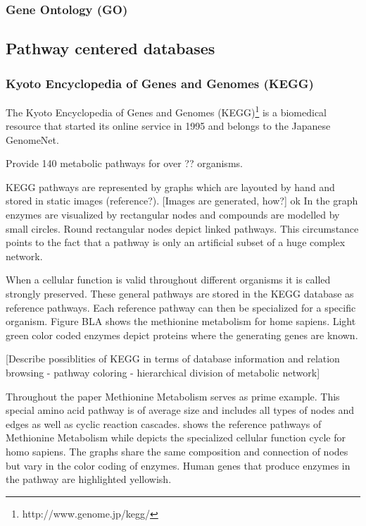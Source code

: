 \subsubsection{Gene Ontology (GO)}

\subsection{Pathway centered databases}

\subsubsection{Kyoto Encyclopedia of Genes and Genomes (KEGG)}

The Kyoto Encyclopedia of Genes and Genomes (KEGG)\footnote{http://www.genome.jp/kegg/} is a biomedical resource that started its online service in 1995 and belongs to the Japanese GenomeNet.

Provide 140 metabolic pathways for over ?? organisms.

KEGG pathways are represented by graphs which are layouted by hand and stored in static images (reference?). [Images are generated, how?]
ok
In the graph enzymes are visualized by rectangular nodes and compounds are modelled by small circles. Round rectangular nodes depict linked pathways. This circumstance points to the fact that a pathway is only an artificial subset of a huge complex network. 

When a cellular function is valid throughout different organisms it is called strongly preserved. These general pathways are stored in the KEGG database as reference pathways. Each reference pathway can then be specialized for a specific organism. Figure BLA shows the methionine metabolism for home sapiens. Light green color coded enzymes depict proteins where the generating genes are known. 

[Describe possiblities of KEGG in terms of database information and relation browsing - pathway coloring - hierarchical division of metabolic network]

Throughout the paper Methionine Metabolism serves as prime example. This special amino acid pathway is of average size and includes all types of nodes and edges as well as cyclic reaction cascades.  shows the reference pathways of Methionine Metabolism while  depicts the specialized cellular function cycle for homo sapiens. The graphs share the same composition and connection of nodes but vary in the color coding of enzymes. Human genes that produce enzymes in the pathway are highlighted yellowish. 

